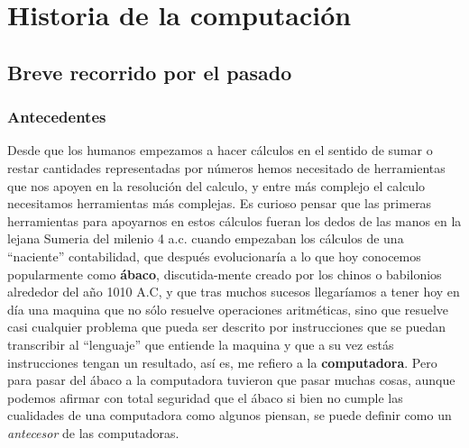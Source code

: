 \documentclass[letterpaper,12pt,oneside]{book}
\begin{document}



\tableofcontents
\listoffigures

\mainmatter

\chapter{Historia de la computación} %


	\section{Breve recorrido por el pasado}
		\subsection{Antecedentes}
		
		Desde que los humanos empezamos a hacer cálculos en el sentido de sumar o restar cantidades representadas por números	hemos necesitado de herramientas
		que nos apoyen en la resolución del calculo, y entre más complejo el calculo necesitamos herramientas más complejas. Es curioso pensar que las
		primeras herramientas para apoyarnos en estos cálculos fueran los dedos de las manos en la lejana Sumeria del milenio 4 a.c. cuando empezaban
		los cálculos de una ``naciente'' contabilidad, que después evolucionaría a lo que hoy conocemos popularmente como \textbf{ábaco}, discutida-mente
		creado por los chinos o babilonios alrededor del año 1010 A.C, y que tras muchos sucesos llegaríamos a tener hoy en día una maquina que no sólo
		resuelve operaciones aritméticas, sino que resuelve casi cualquier problema que pueda ser descrito por instrucciones que se puedan transcribir
		al ``lenguaje'' que entiende la maquina y que a su vez estás instrucciones tengan un resultado, así es, me refiero a la \textbf{computadora}. Pero
		para pasar del ábaco a la computadora tuvieron que pasar muchas cosas, aunque podemos afirmar con total seguridad que el ábaco si bien no cumple
		las cualidades de una computadora como algunos piensan, se puede definir como un \textit{antecesor} de las computadoras.
		
		
\end{document}

